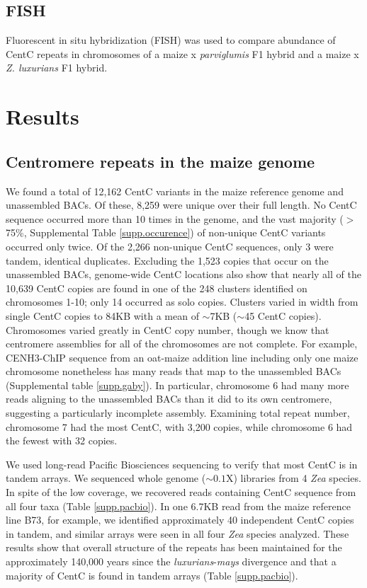 \subsection*{FISH}

Fluorescent in situ hybridization (FISH) was used to compare abundance of CentC repeats in chromosomes of a maize x \emph{parviglumis} F1 hybrid and a maize x \emph{Z. luxurians} F1 hybrid. 	

\section*{Results}
\label{results}

\subsection*{Centromere repeats in the maize genome}

We found a total of 12,162 CentC variants in the maize reference genome and unassembled BACs.  Of these, 8,259 were unique over their full length. No CentC sequence occurred more than 10 times in the genome, and the vast majority ($>$75\%, Supplemental Table \ref{supp.occurence}) of non-unique CentC variants occurred only twice.  Of the 2,266 non-unique CentC sequences, only 3 were tandem, identical duplicates.  Excluding the 1,523 copies that occur on the unassembled BACs, genome-wide CentC locations also show that nearly all of the 10,639 CentC copies are found in one of the 248 clusters identified on chromosomes 1-10; only 14 occurred as solo copies.  Clusters varied in width from single CentC copies to 84KB with a mean of $\sim$7KB ($\sim$45 CentC copies). Chromosomes varied greatly in CentC copy number, though we know that centromere assemblies for all of the chromosomes are not complete.   For example, CENH3-ChIP sequence from an oat-maize addition line including only one maize chromosome \citep{kynast2001} nonetheless has many reads that map to the unassembled BACs (Supplemental table \ref{supp.gaby}).  In particular, chromosome 6 had many more reads aligning to the unassembled BACs than it did to its own centromere, suggesting a particularly incomplete assembly.  Examining total repeat number, chromosome 7 had the most CentC, with 3,200 copies, while chromosome 6 had the fewest with 32 copies.

We used long-read Pacific Biosciences sequencing to verify that most CentC is in tandem arrays. We sequenced whole genome ($\sim 0.1$X) libraries from 4 \emph{Zea} species.  In spite of the low coverage, we recovered reads containing CentC sequence from all four taxa (Table \ref{supp.pacbio}).  In one 6.7KB read from the maize reference line B73, for example, we identified approximately 40 independent CentC copies in tandem, and similar arrays were seen in all four \emph{Zea} species analyzed.  These results show that overall structure of the repeats has been maintained for the approximately 140,000 years since the \emph{luxurians}-\emph{mays} divergence \citep{Hanson1996,  Ross-Ibarra2009} and that a majority of CentC is found in tandem arrays (Table \ref{supp.pacbio}).

